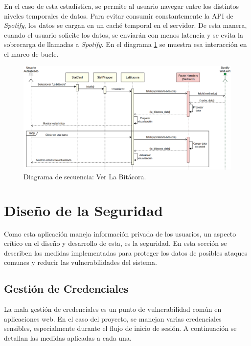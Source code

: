 En el caso de esta estadística, se permite al usuario navegar entre los distintos niveles temporales de datos. Para evitar consumir constantemente la API de \textit{Spotify}, los datos se cargan en un caché temporal en el servidor. De esta manera, cuando el usuario solicite los datos, se enviarán con menos latencia y se evita la sobrecarga de llamadas a \textit{Spotify}. En el diagrama \ref{fig:ds_ver_la_bitacora} se muestra esa interacción en el marco de bucle.

\begin{figure}[H]
    \centering
    \includegraphics[width=\textwidth]{figures/diagramas_secuencia/ds_ver_la_bitacora.png}
    \caption{Diagrama de secuencia: Ver La Bitácora.}
    \label{fig:ds_ver_la_bitacora}
\end{figure}

\section{Diseño de la Seguridad} \label{sec:diseno_seguridad}

Como esta aplicación maneja información privada de los usuarios, un aspecto crítico en el diseño y desarrollo de esta, es la seguridad. En esta sección se describen las medidas implementadas para proteger los datos de posibles ataques comunes y reducir las vulnerabilidades del sistema.

\subsection{Gestión de Credenciales}

La mala gestión de credenciales es un punto de vulnerabilidad común en aplicaciones web. En el caso del proyecto, se manejan varias credenciales sensibles, especialmente durante el flujo de inicio de sesión. A continuación se detallan las medidas aplicadas a cada una.

